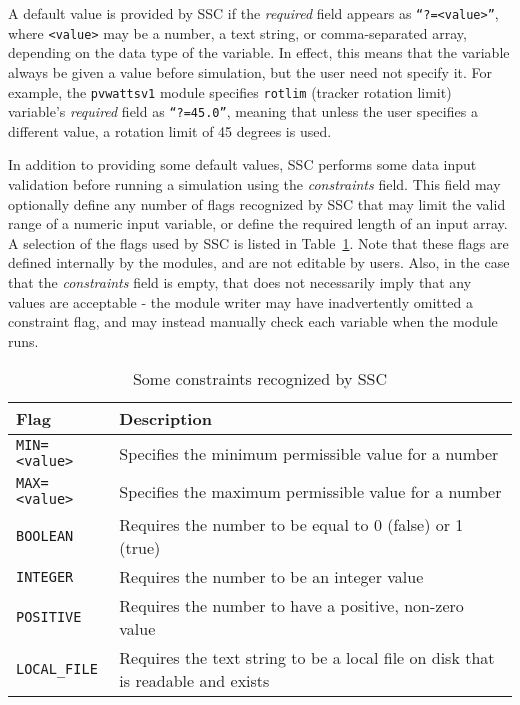\documentclass{article}
\begin{document}
A default value is provided by SSC if the \emph{required} field appears as \texttt{``?=<value>''}, where \texttt{<value>} may be a number, a text string, or comma-separated array, depending on the data type of the variable.  In effect, this means that the variable always be given a value before simulation, but the user need not specify it.  For example, the \texttt{pvwattsv1} module specifies \texttt{rotlim} (tracker rotation limit) variable's \emph{required} field as \texttt{``?=45.0''}, meaning that unless the user specifies a different value, a rotation limit of 45 degrees is used.

In addition to providing some default values, SSC performs some data input validation before running a simulation using the \emph{constraints} field.  This field may optionally define any number of flags recognized by SSC that may limit the valid range of a numeric input variable, or define the required length of an input array.  A selection of the flags used by SSC is listed in Table~\ref{tab_constraints}.  Note that these flags are defined internally by the modules, and are not editable by users.  Also, in the case that the \emph{constraints} field is empty, that does not necessarily imply that any values are acceptable - the module writer may have inadvertently omitted a constraint flag, and may instead manually check each variable when the module runs.

\begin{table}[ht]
\begin{center}
\begin{tabular}{ll}
Flag & Description\\
\hline
\texttt{MIN=<value>} & Specifies the minimum permissible value for a number \\
\texttt{MAX=<value>} & Specifies the maximum permissible value for a number \\
\texttt{BOOLEAN} & Requires the number to be equal to 0 (false) or 1 (true) \\
\texttt{INTEGER} & Requires the number to be an integer value \\
\texttt{POSITIVE} & Requires the number to have a positive, non-zero value \\
\texttt{LOCAL\_FILE} & Requires the text string to be a local file on disk that is readable and exists \\
\end{tabular}
\caption{Some constraints recognized by SSC}
\label{tab_constraints}
\end{center}
\end{table}
\end{document}
